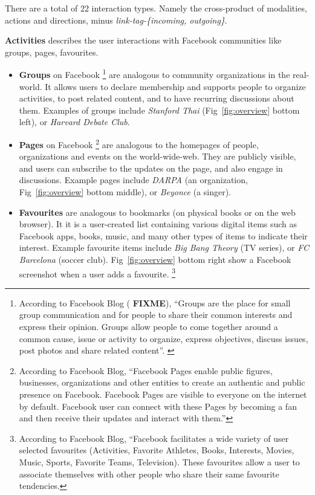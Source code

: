 There are a total of 22 interaction types. Namely the cross-product of modalities, actions and directions, minus {\em link-tag-\{incoming, outgoing\}}. 

{\bf Activities} describes the user interactions with Facebook communities like groups, pages, favourites.
\begin{itemize}
  \item \textbf{Groups} on Facebook 
\footnote{According to Facebook Blog ( {\bf FIXME}), ``Groups are the place for small group communication and for people to share their common interests and express their opinion. Groups allow people to come together around a common cause, issue or activity to organize, express objectives, discuss issues, post photos and share related content''. 
\label{fn:fbblog}}
are analogous to community organizations in the real-world. It allows users to declare membership and supports people to organize activities, to post related content, and to have recurring discussions about them.  Examples of groups include {\em Stanford Thai} (Fig~\ref{fig:overview} bottom left), or {\em Harvard Debate Club}.
  \item \textbf{Pages} on Facebook
  \footnote{According to Facebook Blog, ``Facebook Pages enable public figures, businesses, organizations and other entities to create an authentic and public presence on Facebook. Facebook Pages are visible to everyone on the internet by default. Facebook user can connect with these Pages by becoming a fan and then receive their updates and interact with them.'' }
  are analogous to the homepages of people, organizations and events on the world-wide-web. They are publicly visible, and users can subscribe to the updates on the page, and also engage in discussions. Example pages include {\em DARPA} (an organization, Fig~\ref{fig:overview} bottom middle), or {\em Beyonce} (a singer).

  \item \textbf{Favourites} are analogous to bookmarks (on physical books or on the web browser). It it is a user-created list containing various digital items such as Facebook apps, books, music, and many other types of items to indicate their interest. Example favourite items include {\em Big Bang Theory} (TV series), or {\em FC Barcelona} (soccer club). Fig~\ref{fig:overview} bottom right show a Facebook screenshot when a user adds a favourite.
  \footnote{According to Facebook Blog, ``Facebook facilitates a wide variety of user selected favourites (Activities, Favorite Athletes, Books, Interests, Movies, Music, Sports, Favorite Teams, Television). These favourites allow a user to associate themselves with other people who share their same favourite tendencies.}
\end{itemize} 

